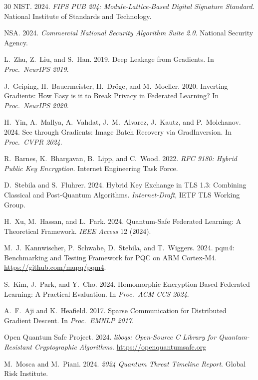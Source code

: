 \documentclass[sigconf,nonacm]{acmart}
\begin{document}
\begin{thebibliography}{30}
NIST. 2024. \textit{FIPS PUB 204: Module-Lattice-Based Digital
Signature Standard}. National Institute of Standards and Technology.

NSA. 2024. \textit{Commercial National Security Algorithm Suite 2.0}.
National Security Agency.

L.~Zhu, Z.~Liu, and S.~Han. 2019. Deep Leakage from Gradients.
In \textit{Proc.\ NeurIPS 2019}.

J.~Geiping, H.~Bauermeister, H.~Dr\"oge, and M.~Moeller. 2020.
Inverting Gradients: How Easy is it to Break Privacy in Federated
Learning? In \textit{Proc.\ NeurIPS 2020}.

H.~Yin, A.~Mallya, A.~Vahdat, J.~M.~Alvarez, J.~Kautz, and
P.~Molchanov. 2024. See through Gradients: Image Batch Recovery
via GradInversion. In \textit{Proc.\ CVPR 2024}.

R.~Barnes, K.~Bhargavan, B.~Lipp, and C.~Wood. 2022. \textit{RFC 9180:
Hybrid Public Key Encryption}. Internet Engineering Task Force.

D.~Stebila and S.~Fluhrer. 2024. Hybrid Key Exchange in TLS 1.3:
Combining Classical and Post-Quantum Algorithms. \textit{Internet-Draft},
IETF TLS Working Group.

H.~Xu, M.~Hassan, and L.~Park. 2024. Quantum-Safe Federated Learning:
A Theoretical Framework. \textit{IEEE Access} 12 (2024).

M.~J.~Kannwischer, P.~Schwabe, D.~Stebila, and T.~Wiggers. 2024.
pqm4: Benchmarking and Testing Framework for PQC on ARM Cortex-M4.
\url{https://github.com/mupq/pqm4}.

S.~Kim, J.~Park, and Y.~Cho. 2024. Homomorphic-Encryption-Based
Federated Learning: A Practical Evaluation. In
\textit{Proc.\ ACM CCS 2024}.

A.~F.~Aji and K.~Heafield. 2017. Sparse Communication for Distributed
Gradient Descent. In \textit{Proc.\ EMNLP 2017}.

Open Quantum Safe Project. 2024. \textit{liboqs: Open-Source C
Library for Quantum-Resistant Cryptographic Algorithms}.
\url{https://openquantumsafe.org}

M.~Mosca and M.~Piani. 2024. \textit{2024 Quantum Threat Timeline
Report}. Global Risk Institute.


\end{thebibliography}
\end{document}
